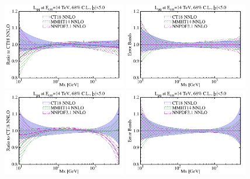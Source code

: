 % 
\begin{figure}[!htbp]
	\begin{center}
		\hspace*{-0.4cm}
		\includegraphics[width=0.48\textwidth]{./fig/Lumi_CT18NNLO_MMHT_NNPDF31/Lumi_14TeV_ym-lt-5-0_asym_30__68CL-CT18NNLO_MMHT2014nnlo_NNPDF31nnloas01181000__00_qQr_ect.pdf} 
		\includegraphics[width=0.48\textwidth]{./fig/Lumi_CT18NNLO_MMHT_NNPDF31/Lumi_14TeV_ym-lt-5-0_asym_30__68CL-CT18NNLO_MMHT2014nnlo_NNPDF31nnloas01181000__00_qQ2_ect.pdf} \\
		\includegraphics[width=0.48\textwidth]{./fig/Lumi_CT18NNLO_MMHT_NNPDF31/Lumi_14TeV_ym-lt-5-0_asym_30__68CL-CT18NNLO_MMHT2014nnlo_NNPDF31nnloas01181000__00_gqr_ect.pdf} 
		\includegraphics[width=0.48\textwidth]{./fig/Lumi_CT18NNLO_MMHT_NNPDF31/Lumi_14TeV_ym-lt-5-0_asym_30__68CL-CT18NNLO_MMHT2014nnlo_NNPDF31nnloas01181000__00_gq2_ect.pdf} \\

\end{center}
\end{figure}
